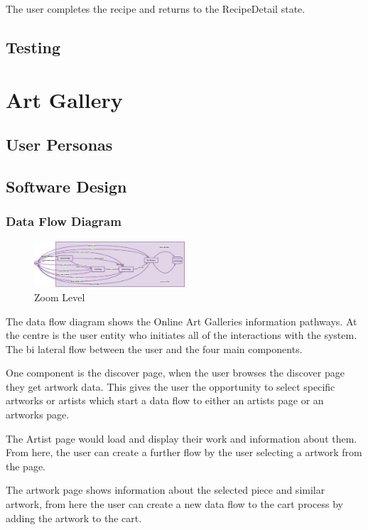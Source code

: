 \documentclass[]{project_final}
\begin{document}
The user completes the recipe and returns to the RecipeDetail state.
\newpage




\subsection{Testing}

\newpage
\section{Art Gallery}
\subsection{User Personas}
\subsection{Software Design}
\subsubsection{Data Flow Diagram}
\begin{figure}[ht!]
    \centering
    \includegraphics[width=0.5\textwidth]{DataFlowDiagram.png}
    \vspace*{0.0cm}
    \caption{Zoom Level}
    \label{fig:1}
\end{figure}

The data flow diagram shows the Online Art Galleries information pathways.
At the centre is the user entity who initiates all of the interactions with the system. The bi lateral flow between the user and the four main components.

One component is the discover page, when the user browses the discover page they get artwork data. This gives the user the opportunity to select specific artworks or artists which start a data flow to either an artists page or an artworks page.

The Artist page would load and display their work and information about them. From here, the user can create a further flow by the user selecting a artwork from the page.

The artwork page shows information about the selected piece and similar artwork, from here the user can create a new data flow to the cart process by adding the artwork to the cart.
\end{document}
